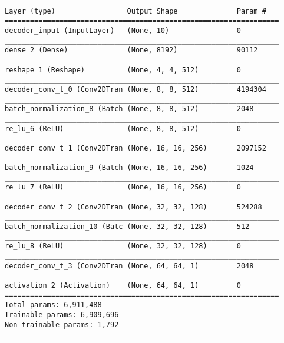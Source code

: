 \begin{lstlisting}[caption={dSprites-VAE-GAN Decoder},captionpos=b,basicstyle=\tiny, label={lst:mnist-vae-decoder}]
_________________________________________________________________
Layer (type)                 Output Shape              Param #
=================================================================
decoder_input (InputLayer)   (None, 10)                0
_________________________________________________________________
dense_2 (Dense)              (None, 8192)              90112
_________________________________________________________________
reshape_1 (Reshape)          (None, 4, 4, 512)         0
_________________________________________________________________
decoder_conv_t_0 (Conv2DTran (None, 8, 8, 512)         4194304
_________________________________________________________________
batch_normalization_8 (Batch (None, 8, 8, 512)         2048
_________________________________________________________________
re_lu_6 (ReLU)               (None, 8, 8, 512)         0
_________________________________________________________________
decoder_conv_t_1 (Conv2DTran (None, 16, 16, 256)       2097152
_________________________________________________________________
batch_normalization_9 (Batch (None, 16, 16, 256)       1024
_________________________________________________________________
re_lu_7 (ReLU)               (None, 16, 16, 256)       0
_________________________________________________________________
decoder_conv_t_2 (Conv2DTran (None, 32, 32, 128)       524288
_________________________________________________________________
batch_normalization_10 (Batc (None, 32, 32, 128)       512
_________________________________________________________________
re_lu_8 (ReLU)               (None, 32, 32, 128)       0
_________________________________________________________________
decoder_conv_t_3 (Conv2DTran (None, 64, 64, 1)         2048
_________________________________________________________________
activation_2 (Activation)    (None, 64, 64, 1)         0
=================================================================
Total params: 6,911,488
Trainable params: 6,909,696
Non-trainable params: 1,792
_________________________________________________________________
\end{lstlisting}